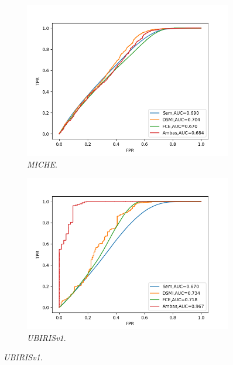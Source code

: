 \begin{figure}[h!]
    \centering %
\begin{subfigure}{0.35\textwidth}
  \includegraphics[width=\linewidth]{img/Resultados/miche_inter_distortion_auc.png}
  \caption{\textit{MICHE}.}
\end{subfigure}\hfil %
\begin{subfigure}{0.35\textwidth}
  \includegraphics[width=\linewidth]{img/Resultados/ubirisv1_inter_distortion_auc.png}
  \caption{\textit{UBIRISv1}.}
\end{subfigure}


\end{figure}
